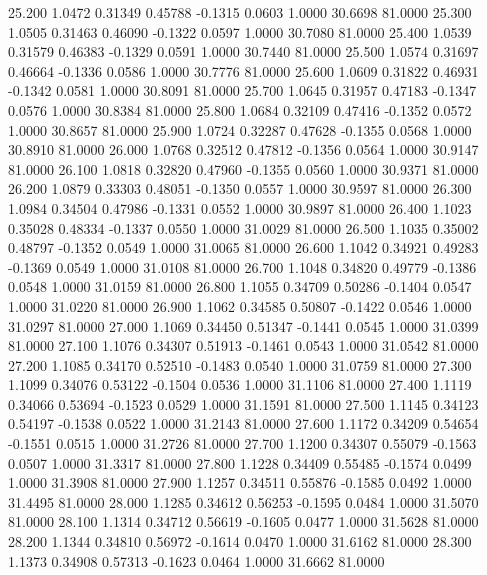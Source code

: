   25.200   1.0472   0.31349   0.45788  -0.1315   0.0603   1.0000  30.6698  81.0000
  25.300   1.0505   0.31463   0.46090  -0.1322   0.0597   1.0000  30.7080  81.0000
  25.400   1.0539   0.31579   0.46383  -0.1329   0.0591   1.0000  30.7440  81.0000
  25.500   1.0574   0.31697   0.46664  -0.1336   0.0586   1.0000  30.7776  81.0000
  25.600   1.0609   0.31822   0.46931  -0.1342   0.0581   1.0000  30.8091  81.0000
  25.700   1.0645   0.31957   0.47183  -0.1347   0.0576   1.0000  30.8384  81.0000
  25.800   1.0684   0.32109   0.47416  -0.1352   0.0572   1.0000  30.8657  81.0000
  25.900   1.0724   0.32287   0.47628  -0.1355   0.0568   1.0000  30.8910  81.0000
  26.000   1.0768   0.32512   0.47812  -0.1356   0.0564   1.0000  30.9147  81.0000
  26.100   1.0818   0.32820   0.47960  -0.1355   0.0560   1.0000  30.9371  81.0000
  26.200   1.0879   0.33303   0.48051  -0.1350   0.0557   1.0000  30.9597  81.0000
  26.300   1.0984   0.34504   0.47986  -0.1331   0.0552   1.0000  30.9897  81.0000
  26.400   1.1023   0.35028   0.48334  -0.1337   0.0550   1.0000  31.0029  81.0000
  26.500   1.1035   0.35002   0.48797  -0.1352   0.0549   1.0000  31.0065  81.0000
  26.600   1.1042   0.34921   0.49283  -0.1369   0.0549   1.0000  31.0108  81.0000
  26.700   1.1048   0.34820   0.49779  -0.1386   0.0548   1.0000  31.0159  81.0000
  26.800   1.1055   0.34709   0.50286  -0.1404   0.0547   1.0000  31.0220  81.0000
  26.900   1.1062   0.34585   0.50807  -0.1422   0.0546   1.0000  31.0297  81.0000
  27.000   1.1069   0.34450   0.51347  -0.1441   0.0545   1.0000  31.0399  81.0000
  27.100   1.1076   0.34307   0.51913  -0.1461   0.0543   1.0000  31.0542  81.0000
  27.200   1.1085   0.34170   0.52510  -0.1483   0.0540   1.0000  31.0759  81.0000
  27.300   1.1099   0.34076   0.53122  -0.1504   0.0536   1.0000  31.1106  81.0000
  27.400   1.1119   0.34066   0.53694  -0.1523   0.0529   1.0000  31.1591  81.0000
  27.500   1.1145   0.34123   0.54197  -0.1538   0.0522   1.0000  31.2143  81.0000
  27.600   1.1172   0.34209   0.54654  -0.1551   0.0515   1.0000  31.2726  81.0000
  27.700   1.1200   0.34307   0.55079  -0.1563   0.0507   1.0000  31.3317  81.0000
  27.800   1.1228   0.34409   0.55485  -0.1574   0.0499   1.0000  31.3908  81.0000
  27.900   1.1257   0.34511   0.55876  -0.1585   0.0492   1.0000  31.4495  81.0000
  28.000   1.1285   0.34612   0.56253  -0.1595   0.0484   1.0000  31.5070  81.0000
  28.100   1.1314   0.34712   0.56619  -0.1605   0.0477   1.0000  31.5628  81.0000
  28.200   1.1344   0.34810   0.56972  -0.1614   0.0470   1.0000  31.6162  81.0000
  28.300   1.1373   0.34908   0.57313  -0.1623   0.0464   1.0000  31.6662  81.0000
